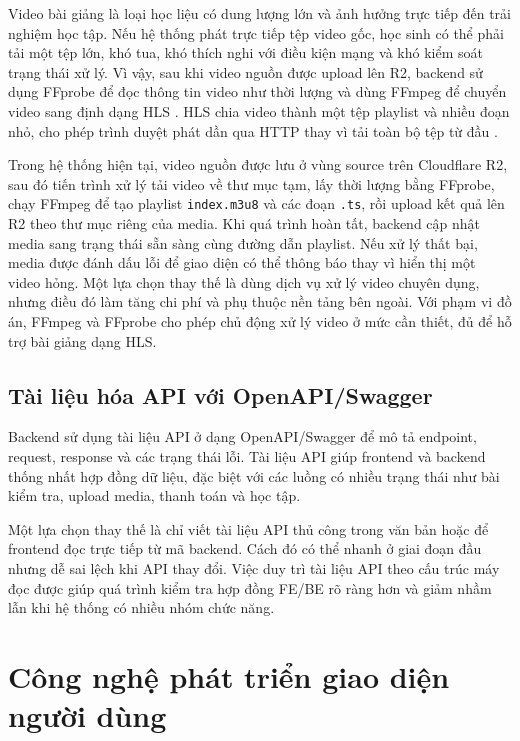 \documentclass[../DoAn.tex]{subfiles}
\begin{document}
Video bài giảng là loại học liệu có dung lượng lớn và ảnh hưởng trực tiếp đến trải nghiệm học tập. Nếu hệ thống phát trực tiếp tệp video gốc, học sinh có thể phải tải một tệp lớn, khó tua, khó thích nghi với điều kiện mạng và khó kiểm soát trạng thái xử lý. Vì vậy, sau khi video nguồn được upload lên R2, backend sử dụng FFprobe để đọc thông tin video như thời lượng và dùng FFmpeg để chuyển video sang định dạng HLS \cite{ffprobe_docs,ffmpeg_docs}. HLS chia video thành một tệp playlist và nhiều đoạn nhỏ, cho phép trình duyệt phát dần qua HTTP thay vì tải toàn bộ tệp từ đầu \cite{pantos2017hls}.

Trong hệ thống hiện tại, video nguồn được lưu ở vùng source trên Cloudflare R2, sau đó tiến trình xử lý tải video về thư mục tạm, lấy thời lượng bằng FFprobe, chạy FFmpeg để tạo playlist \texttt{index.m3u8} và các đoạn \texttt{.ts}, rồi upload kết quả lên R2 theo thư mục riêng của media. Khi quá trình hoàn tất, backend cập nhật media sang trạng thái sẵn sàng cùng đường dẫn playlist. Nếu xử lý thất bại, media được đánh dấu lỗi để giao diện có thể thông báo thay vì hiển thị một video hỏng. Một lựa chọn thay thế là dùng dịch vụ xử lý video chuyên dụng, nhưng điều đó làm tăng chi phí và phụ thuộc nền tảng bên ngoài. Với phạm vi đồ án, FFmpeg và FFprobe cho phép chủ động xử lý video ở mức cần thiết, đủ để hỗ trợ bài giảng dạng HLS.

\subsection{Tài liệu hóa API với OpenAPI/Swagger}
\label{subsection:3.1.8}

Backend sử dụng tài liệu API ở dạng OpenAPI/Swagger để mô tả endpoint, request, response và các trạng thái lỗi. Tài liệu API giúp frontend và backend thống nhất hợp đồng dữ liệu, đặc biệt với các luồng có nhiều trạng thái như bài kiểm tra, upload media, thanh toán và học tập.

Một lựa chọn thay thế là chỉ viết tài liệu API thủ công trong văn bản hoặc để frontend đọc trực tiếp từ mã backend. Cách đó có thể nhanh ở giai đoạn đầu nhưng dễ sai lệch khi API thay đổi. Việc duy trì tài liệu API theo cấu trúc máy đọc được giúp quá trình kiểm tra hợp đồng FE/BE rõ ràng hơn và giảm nhầm lẫn khi hệ thống có nhiều nhóm chức năng.

\section{Công nghệ phát triển giao diện người dùng}
\label{section:3.2}
\end{document}
